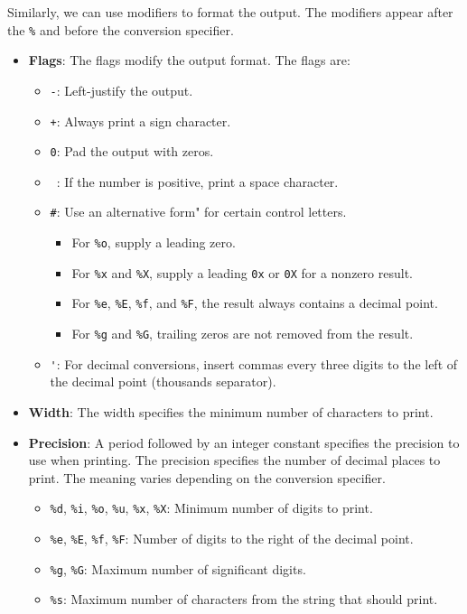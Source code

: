 \newpage

Similarly, we can use modifiers to format the output.
The modifiers appear after the \lstinline|%| and before the conversion specifier.

\begin{itemize}
  \item \textbf{Flags}: The flags modify the output format. The flags are:
    \begin{itemize}
      \item \lstinline|-|: Left-justify the output.
      \item \lstinline|+|: Always print a sign character.
      \item \lstinline|0|: Pad the output with zeros.
      \item \lstinline| |: If the number is positive, print a space character.
      \item \lstinline|#|: Use an alternative form" for certain control letters. 
      \begin{itemize}
        \item For \lstinline|%o|, supply a leading zero. 
        \item For \lstinline|%x| and \lstinline|%X|, supply a leading \lstinline|0x| or \lstinline|0X| for a nonzero result.
        \item For \lstinline|%e|, \lstinline|%E|, \lstinline|%f|, and \lstinline|%F|, the result always contains a decimal point.
        \item For \lstinline|%g| and \lstinline|%G|, trailing zeros are not removed from the result.
      \end{itemize}
      \item \lstinline|'|: For decimal conversions, insert commas every three digits to the left of the decimal point (thousands separator).
    \end{itemize}
  \item \textbf{Width}: The width specifies the minimum number of characters to print.
  \item \textbf{Precision}: A period followed by an integer constant specifies the precision to use when printing. 
    The precision specifies the number of decimal places to print.
    The meaning varies depending on the conversion specifier.
    \begin{itemize}
    \item \lstinline|%d|, \lstinline|%i|, \lstinline|%o|, \lstinline|%u|, \lstinline|%x|, \lstinline|%X|: Minimum number of digits to print.
    \item \lstinline|%e|, \lstinline|%E|, \lstinline|%f|, \lstinline|%F|: Number of digits to the right of the decimal point.
    \item \lstinline|%g|, \lstinline|%G|: Maximum number of significant digits.
    \item \lstinline|%s|: Maximum number of characters from the string that should print.
    \end{itemize}
\end{itemize}


